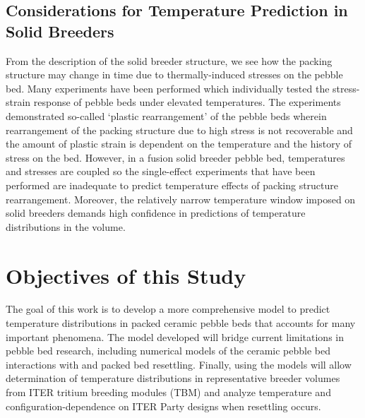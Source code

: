 \subsection{Considerations for Temperature Prediction in Solid Breeders}
From the description of the solid breeder structure, we see how the packing structure may change in time due to thermally-induced stresses on the pebble bed. Many experiments have been performed which individually tested the stress-strain response of pebble beds under elevated temperatures. The experiments demonstrated so-called `plastic rearrangement' of the pebble beds wherein rearrangement of the packing structure due to high stress is not recoverable and the amount of plastic strain is dependent on the temperature and the history of stress on the bed. However, in a fusion solid breeder pebble bed, temperatures and stresses are coupled so the single-effect experiments that have been performed are inadequate to predict temperature effects of packing structure rearrangement. Moreover, the relatively narrow temperature window imposed on solid breeders demands high confidence in predictions of temperature distributions in the volume.


\section{Objectives of this Study}\label{sec:intro-scope-of-work}
The goal of this work is to develop a more comprehensive model to predict temperature distributions in packed ceramic pebble beds that accounts for many important phenomena. The model developed will bridge current limitations in pebble bed research, including numerical models of the ceramic pebble bed interactions with and packed bed resettling. Finally, using the models will allow determination of temperature distributions in representative breeder volumes from ITER tritium breeding modules (TBM) and analyze temperature and configuration-dependence on ITER Party designs when resettling occurs.

